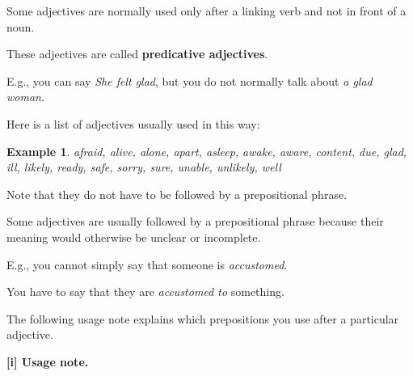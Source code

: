 \documentclass[oneside]{book}
\numberwithin{equation}{section}
\newtheorem{example}{Example}[section]
\begin{document}
%
\noindent{} Some adjectives are normally used only after a linking verb and not in front of a noun.

These adjectives are called \textbf{predicative adjectives}.

%
E.g., you can say \textit{She felt glad}, but you do not normally talk about \textit{a glad woman}.

%
Here is a list of adjectives usually used in this way:
\begin{example}
    afraid, alive, alone, apart, asleep, awake, aware, content, due, glad, ill, likely, ready, safe, sorry, sure, unable, unlikely, well
\end{example}
Note that they do not have to be followed by a prepositional phrase.

%
\noindent{} Some adjectives are usually followed by a prepositional phrase because their meaning would otherwise be unclear or incomplete.

E.g., you cannot simply say that someone is \textit{accustomed}.

You have to say that they are \textit{accustomed to} something.

%
The following usage note explains which prepositions you use after a particular adjective.

%
\textbf{[i] Usage note.}
\end{document}
